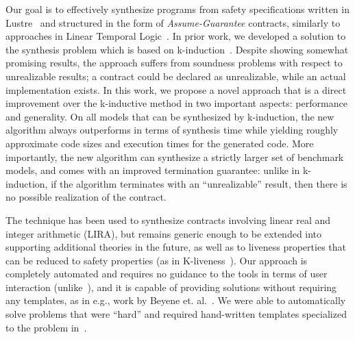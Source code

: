 Our goal is to effectively synthesize programs from safety specifications written in Lustre~\cite{lustrev6} and structured in the form of {\em
Assume-Guarantee} contracts, similarly to approaches in Linear Temporal Logic~\cite{ringert2017synthesis}. In prior work, we developed a solution to the synthesis problem which is based on k-induction~\cite{gacek2015towards,katis2016towards,KatisFGBGW16}.
Despite showing somewhat promising results, the approach suffers from soundness problems with respect to unrealizable results; a contract could be declared as unrealizable, while an actual implementation exists.
In this work, we propose a novel approach that is a direct improvement over the k-inductive method in two important aspects: performance and generality.  On all models that can be synthesized
by k-induction, the new algorithm always outperforms in terms of synthesis time while yielding roughly approximate code sizes and execution times for the generated code. More importantly, the new algorithm can synthesize a strictly larger set of benchmark models,
and comes with an improved termination guarantee: unlike in k-induction, if the algorithm terminates with an ``unrealizable'' result, then there is no possible realization of the contract.

The technique has been used to synthesize contracts involving linear real and integer arithmetic (LIRA),
but remains generic enough to be extended into supporting additional theories
in the future, as well as to liveness properties that can be reduced to safety properties (as in K-liveness~\cite{claessen2012liveness}).  Our approach is completely automated and requires no guidance to the tools in terms of user interaction (unlike~\cite{ryzhyk2014user,ryzhyk2016developing}), and it is capable of providing solutions without requiring any templates, as in e.g., work by Beyene et. al.~\cite{beyene2014constraint}.  We were able to automatically solve problems that were ``hard'' and required hand-written templates specialized to the problem in~\cite{beyene2014constraint}.


